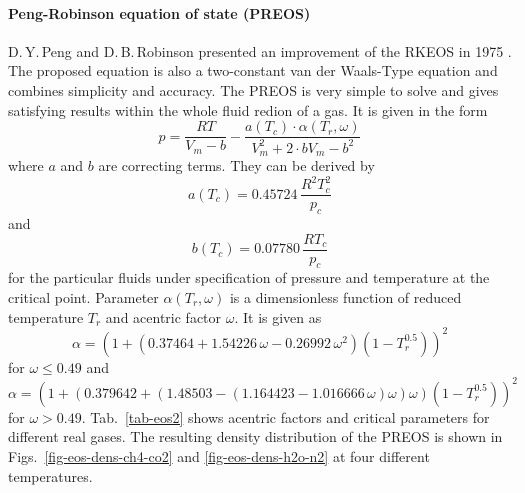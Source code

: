 \paragraph{Peng-Robinson equation of state (PREOS)}

D.\,Y.\,{Peng} and D.\,B.\,{Robinson} presented an improvement of the RKEOS in 1975 \cite{PenRob:75}. The proposed equation is also a two-constant van der Waals-Type equation and combines simplicity and accuracy. The PREOS is very simple to solve and gives satisfying results within the whole fluid redion of a gas. It is given in the form
%
\begin{equation}
p=\frac{RT}{V_m-b}-\frac{a(T_c)\cdot \alpha (T_r,\omega)}{V_m^2+2\cdot bV_m-b^2}
\label{eq-preos1}
\end{equation}
%
where $a$ and $b$ are correcting terms. They can be derived by %
%
\begin{equation} 
a(T_c) = 0.45724\,\frac{R^2T_{c}^{2}}{p_c}
\label{eq-preosa}
\end{equation}
%
and
%
\begin{equation} 
b(T_c) = 0.07780\,\frac{RT_c}{p_c}
\label{eq-preosb}
\end{equation}
%
for the particular fluids under specification of pressure and temperature at the critical point.
Parameter $\alpha(T_r,\omega)$ is a dimensionless function of reduced temperature $T_r$ and acentric factor $\omega$. It is given as
%
\begin{equation} 
\alpha = \left( 1+ \left(0.37464 + 1.54226\,\omega - 0.26992\,\omega^2\right)\left(1-T_r^{0.5}\right)\right)^2
\label{eq-preosalpha1}
\end{equation}
%
for $\omega\leq{0.49}$ and
%
\begin{equation} 
\alpha = \left( 1+ \left(0.379642 + \left(1.48503-\left(1.164423-1.016666\,\omega\right)\omega\right)\omega\right)\left(1-T_r^{0.5}\right)\right)^2
\label{eq-preosalpha2}
\end{equation}
%
for $\omega > 0.49$. 
%
Tab.~\ref{tab-eos2} shows acentric factors and critical parameters for different real gases. The resulting density distribution of the 
PREOS is shown in Figs.~\ref{fig-eos-dens-ch4-co2} and \ref{fig-eos-dens-h2o-n2} at four different temperatures. 

